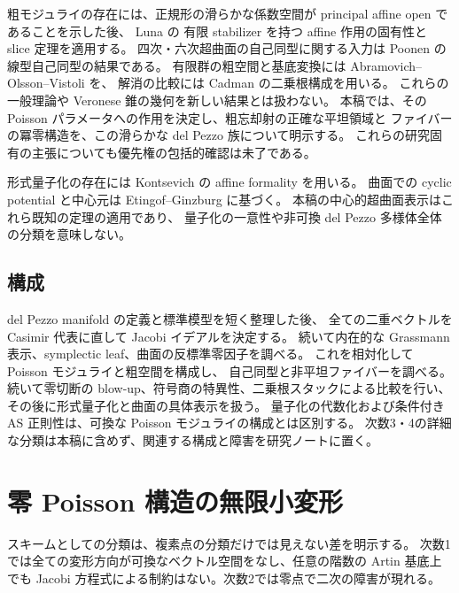 \documentclass[a4paper,11pt]{ltjsarticle}
\numberwithin{equation}{section}
\theoremstyle{plain}
\theoremstyle{definition}
\begin{document}
粗モジュライの存在には、正規形の滑らかな係数空間が principal affine open であることを示した後、
Luna \cite[I, \S4, p.~90; III, \S1, p.~97]{Luna1973} の
有限 stabilizer を持つ affine 作用の固有性と slice 定理を適用する。
四次・六次超曲面の自己同型に関する入力は
Poonen \cite[Theorems 1.5, 1.6]{Poonen2005} の線型自己同型の結果である。
有限群の粗空間と基底変換には Abramovich--Olsson--Vistoli
\cite[Theorem 3.2, Corollary 3.3]{AbramovichOlssonVistoli2008} を、
解消の比較には Cadman \cite[\S\S2.2--2.3]{Cadman2007} の二乗根構成を用いる。
これらの一般理論や Veronese 錐の幾何を新しい結果とは扱わない。
本稿では、その Poisson パラメータへの作用を決定し、粗忘却射の正確な平坦領域と
ファイバーの冪零構造を、この滑らかな del Pezzo 族について明示する。
これらの研究固有の主張についても優先権の包括的確認は未了である。

形式量子化の存在には Kontsevich の affine formality \cite{Kontsevich} を用いる。
曲面での cyclic potential と中心元は
Etingof--Ginzburg \cite[Lemma 7.4.2, Proposition 8.1.1(i)]{EG2010} に基づく。
本稿の中心的超曲面表示はこれら既知の定理の適用であり、
量子化の一意性や非可換 del Pezzo 多様体全体の分類を意味しない。

\subsection{構成}
del Pezzo manifold の定義と標準模型を短く整理した後、
全ての二重ベクトルを Casimir 代表に直して Jacobi イデアルを決定する。
続いて内在的な Grassmann 表示、symplectic leaf、曲面の反標準零因子を調べる。
これを相対化して Poisson モジュライと粗空間を構成し、
自己同型と非平坦ファイバーを調べる。
続いて零切断の blow-up、符号商の特異性、二乗根スタックによる比較を行い、
その後に形式量子化と曲面の具体表示を扱う。
量子化の代数化および条件付き AS 正則性は、可換な Poisson モジュライの構成とは区別する。
次数3・4の詳細な分類は本稿に含めず、関連する構成と障害を研究ノートに置く。









\section{零 Poisson 構造の無限小変形}
\label{sec:infinitesimal}
スキームとしての分類は、複素点の分類だけでは見えない差を明示する。
次数1では全ての変形方向が可換なベクトル空間をなし、任意の階数の Artin 基底上でも
Jacobi 方程式による制約はない。次数2では零点で二次の障害が現れる。
\end{document}
